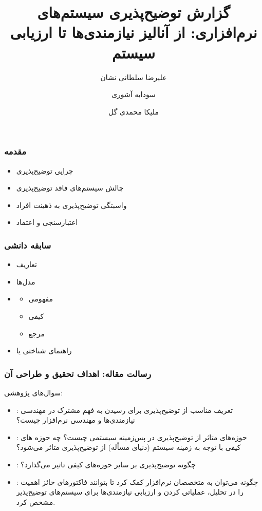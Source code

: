 \documentclass[10pt, a4paper]{beamer}
\title{گزارش توضیح‌پذیری سیستم‌های نرم‌افزاری: از آنالیز نیازمندی‌ها تا ارزیابی
سیستم}
\author{
    علیرضا سلطانی نشان
    \and 
    سودابه آشوری \\
    \and
    ملیکا محمدی گل \\
}
\institute{دانشگاه آزاد اسلامی واحد تهران شمال, خانم دکتر سپیده آدابی}
\begin{document}
\frame{\titlepage}
\begin{frame}
    \frametitle{مقدمه}

    \begin{itemize}
        \item چرایی توضیح‌پذیری
        \item چالش سیستم‌های فاقد توضیح‌پذیری
        \item واسبتگی توضیح‌پذیری به ذهینت افراد
        \item اعتبارسنجی و اعتماد
    \end{itemize}
\end{frame}

\begin{frame}
    \frametitle{سابقه دانشی}

    \begin{itemize}
        \item تعاریف
        \item مدل‌ها
        \item \begin{itemize}
            \item مفهومی
            \item کیفی
            \item مرجع
        \end{itemize}
        \item راهنمای شناختی یا 
    \end{itemize}
\end{frame}

\begin{frame}
    \frametitle{رسالت مقاله: اهداف تحقیق و طراحی آن}
    سوال‌های پژوهشی:

    \begin{itemize}
        \item {}: تعریف مناسب از توضیح‌پذیری برای رسیدن به فهم مشترک در مهندسی
        نیازمندی‌ها و مهندسی نرم‌افزار چیست؟
        \item {}: حوزه‌های متاثر از توضیح‌پذیری در پس‌زمینه سیستمی چیست؟ چه
        حوزه های کیفی با توجه به زمینه سیستم (دنیای مسأله) از توضیح‌پذیری متاثر
        می‌شود؟
        \item {}: چگونه توضیح‌پذیری بر سایر حوزه‌های کیفی تاثیر می‌گذارد؟
        \item {}: چگونه می‌توان به متخصصان نرم‌افزار کمک کرد تا بتوانند
        فاکتورهای حائز اهمیت را در تحلیل، عملیاتی کردن و ارزیابی نیازمندی‌ها برای
        سیستم‌های توضیح‌پذیر مشخص کرد.
    \end{itemize}
\end{frame}
\end{document}
